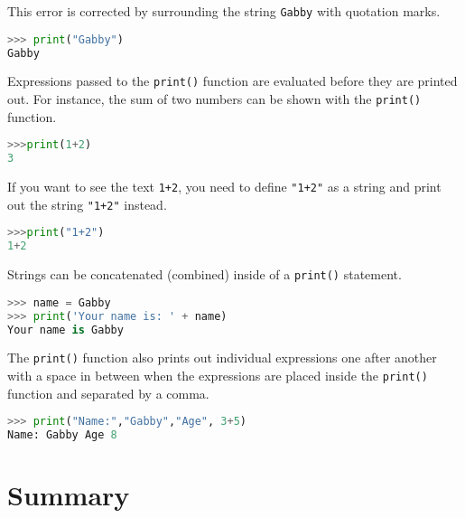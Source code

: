 \documentclass{book}
\newcommand{\passthrough}[1]{#1}
\begin{document}
This error is corrected by surrounding the string
\passthrough{\lstinline!Gabby!} with quotation marks.

\begin{lstlisting}[language=Python]
>>> print("Gabby")
Gabby
\end{lstlisting}
    




    
        Expressions passed to the \passthrough{\lstinline!print()!} function are
evaluated before they are printed out. For instance, the sum of two
numbers can be shown with the \passthrough{\lstinline!print()!}
function.

\begin{lstlisting}[language=Python]
>>>print(1+2)
3
\end{lstlisting}

If you want to see the text \passthrough{\lstinline!1+2!}, you need to
define \passthrough{\lstinline!"1+2"!} as a string and print out the
string \passthrough{\lstinline!"1+2"!} instead.

\begin{lstlisting}[language=Python]
>>>print("1+2")
1+2
\end{lstlisting}
    




    
        Strings can be concatenated (combined) inside of a
\passthrough{\lstinline!print()!} statement.

\begin{lstlisting}[language=Python]
>>> name = Gabby
>>> print('Your name is: ' + name)
Your name is Gabby
\end{lstlisting}
    




    
        The \passthrough{\lstinline!print()!} function also prints out
individual expressions one after another with a space in between when
the expressions are placed inside the \passthrough{\lstinline!print()!}
function and separated by a comma.

\begin{lstlisting}[language=Python]
>>> print("Name:","Gabby","Age", 3+5)
Name: Gabby Age 8
\end{lstlisting}
    




    
        \newpage
        \hypertarget{summary}{%
\section{Summary}\label{summary}}
\end{document}
